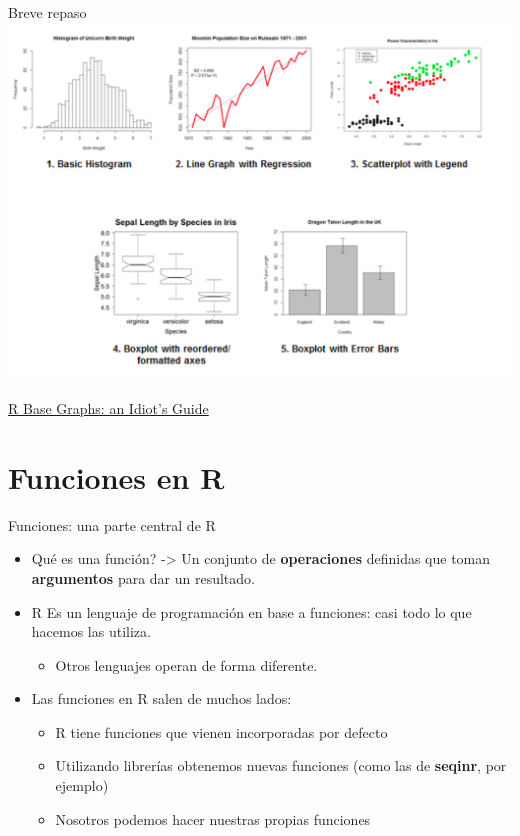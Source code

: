 \documentclass[
  ignorenonframetext,
]{beamer}
\providecommand{\tightlist}{%
  \setlength{\itemsep}{0pt}\setlength{\parskip}{0pt}}
\begin{document}
\begin{frame}{Breve repaso}
\protect\hypertarget{breve-repaso-3}{}
\includegraphics{../../imgs/r_base_graphs.png}

\href{https://rpubs.com/SusanEJohnston/7953}{R Base Graphs: an Idiot's
Guide}
\end{frame}

\hypertarget{funciones-en-r}{%
\section{Funciones en R}\label{funciones-en-r}}

\begin{frame}{Funciones: una parte central de R}
\protect\hypertarget{funciones-una-parte-central-de-r}{}
\begin{itemize}
\tightlist
\item
  Qué es una función? -\textgreater{} Un conjunto de
  \textbf{operaciones} definidas que toman \textbf{argumentos} para dar
  un resultado.
\item
  R Es un lenguaje de programación en base a funciones: casi todo lo que
  hacemos las utiliza.

  \begin{itemize}
  \tightlist
  \item
    Otros lenguajes operan de forma diferente.
  \end{itemize}
\item
  Las funciones en R salen de muchos lados:

  \begin{itemize}
  \tightlist
  \item
    R tiene funciones que vienen incorporadas por defecto
  \item
    Utilizando librerías obtenemos nuevas funciones (como las de
    \textbf{seqinr}, por ejemplo)
  \item
    Nosotros podemos hacer nuestras propias funciones
  \end{itemize}
\end{itemize}
\end{frame}
\end{document}
